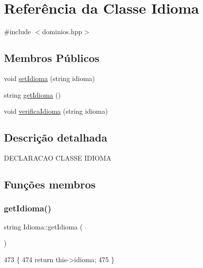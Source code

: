 \hypertarget{class_idioma}{}\section{Referência da Classe Idioma}
\label{class_idioma}


{\ttfamily \#include $<$dominios.\+hpp$>$}

\subsection*{Membros Públicos}
\begin{DoxyCompactItemize}
\item 
void \mbox{\hyperlink{class_idioma_a5c15660dcb0cec1db37a013b990d9895}{set\+Idioma}} (string idioma)
\item 
string \mbox{\hyperlink{class_idioma_ab2f6141eec870d6c40f6ec8d32e68231}{get\+Idioma}} ()
\item 
void \mbox{\hyperlink{class_idioma_a8ea40be7a7fed00c55455009cfc6fc6a}{verifica\+Idioma}} (string idioma)
\end{DoxyCompactItemize}


\subsection{Descrição detalhada}
D\+E\+C\+L\+A\+R\+A\+C\+AO C\+L\+A\+S\+SE I\+D\+I\+O\+MA 

\subsection{Funções membros}
\mbox{\label{class_idioma_ab2f6141eec870d6c40f6ec8d32e68231}} 
\subsubsection{\texorpdfstring{get\+Idioma()}{getIdioma()}}
{\footnotesize\ttfamily string Idioma\+::get\+Idioma (\begin{DoxyParamCaption}{ }\end{DoxyParamCaption})}


\begin{DoxyCode}
473 \{
474   \textcolor{keywordflow}{return} this->idioma;
475 \}
\end{DoxyCode}
\mbox{\label{class_idioma_a5c15660dcb0cec1db37a013b990d9895}} 

